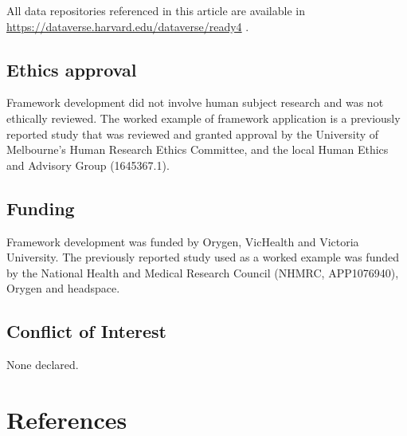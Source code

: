 \documentclass[
]{article}
\begin{document}
All data repositories referenced in this article are available in \url{https://dataverse.harvard.edu/dataverse/ready4} .

\hypertarget{ethics-approval}{%
\subsection*{Ethics approval}\label{ethics-approval}}

Framework development did not involve human subject research and was not ethically reviewed. The worked example of framework application is a previously reported study that was reviewed and granted approval by the University of Melbourne's Human Research Ethics Committee, and the local Human Ethics and Advisory Group (1645367.1).

\hypertarget{funding}{%
\subsection*{Funding}\label{funding}}

Framework development was funded by Orygen, VicHealth and Victoria University. The previously reported study used as a worked example was funded by the National Health and Medical Research Council (NHMRC, APP1076940), Orygen and headspace.

\hypertarget{conflict-of-interest}{%
\subsection*{Conflict of Interest}\label{conflict-of-interest}}

None declared.

\newpage

\hypertarget{references}{%
\section*{References}\label{references}}
\end{document}
